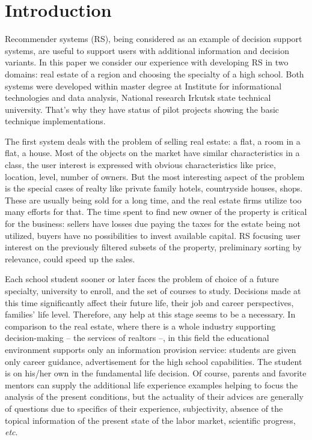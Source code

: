 \documentclass[conference,a4]{IEEEtran}
\begin{document}

\section{Introduction}

Recommender systems (RS), being considered as an example of decision support systems, are useful to support users with additional information and decision variants.  In this paper we consider our experience with developing RS in two domains: real estate of a region and choosing the specialty of a high school.  Both systems were developed within master degree at Institute for informational technologies and data analysis, National research Irkutsk state technical university.  That's why they have status of pilot projects showing the basic technique implementations.

The first system deals with the problem of selling real estate: a flat, a room in a flat, a house.  Most of the objects on the market have similar characteristics in a class, the user interest is expressed with obvious characteristics like price, location, level, number of owners.  But the most interesting aspect of the problem is the special cases of realty like private family hotels, countryside houses, shops.  These are usually being sold for a long time, and the real estate firms utilize too many efforts for that.  The time spent to find new owner of the property is critical for the business: sellers have losses due paying the taxes for the estate being not utilized, buyers have no possibilities to invest available capital.  RS focusing user interest on the previously filtered subsets of the property, preliminary sorting by relevance, could speed up the sales.

Each school student sooner or later faces the problem of choice of a future specialty, university to enroll, and the set of courses to study.  Decisions made at this time significantly affect their future life, their job and career perspectives, families' life level.  Therefore, any help at this stage seems to be a necessary. In comparison to the real estate, where there is a whole industry supporting decision-making -- the services of realtors --, in this field the educational environment supports only an information provision service: students are given only career guidance, advertisement for the high school capabilities.  The student is on his/her own in the fundamental life decision.  Of course, parents and favorite mentors can supply the additional life experience examples helping to focus the analysis of the present conditions, but the actuality of their advices are generally of questions due to specifics of their experience, subjectivity, absence of the topical information of the present state of the labor market, scientific progress, \emph{etc}.
\end{document}
